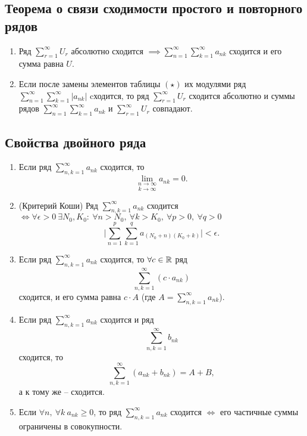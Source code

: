 \subsection{Теорема о связи сходимости простого и повторного рядов}

\begin{theorem}\leavevmode
    \begin{enumerate}
        \item Ряд $ \sum_{r=1}^{\infty}U_r $ абсолютно сходится $\implies \sum_{n=1}^{\infty}\sum_{k=1}^{\infty}a_{nk} $ сходится и его сумма равна $U$.

        \item Если после замены элементов таблицы $(\star)$ их модулями ряд \\ $ \sum_{n=1}^{\infty}\sum_{k=1}^{\infty}|a_{nk}| $ cходится, то ряд $ \sum_{r=1}^{\infty}U_r $ сходится абсолютно и суммы рядов $ \sum_{n=1}^{\infty}\sum_{k=1}^{\infty}a_{nk} $ и $ \sum_{r=1}^{\infty}U_r $ совпадают.
    \end{enumerate}
\end{theorem}

\subsection{Свойства двойного ряда}

\begin{theorem}\leavevmode
    \begin{enumerate}
        \item Если ряд $ \sum_{n,k = 1}^{\infty} a_{nk} $ сходится, то
              \[
                  \underset{k\rightarrow\infty}{\underset{n\rightarrow\infty}{\lim}}a_{nk} = 0.
              \]

        \item (Критерий Коши)
              Ряд $ \sum_{n,k = 1}^{\infty} a_{nk} $ сходится $\iff \forall \epsilon > 0 \ \exists N_0,K_0: \ \forall n > N_0, \ \forall k > K_0, \ \forall p > 0, \ \forall q > 0$
              \[
                  \bigg|\sum_{n=1}^{p}\sum_{k=1}^{q}a_{(N_0 + n)(K_0 + k)}\bigg| < \epsilon.
              \]

        \item Если ряд $ \sum_{n,k = 1}^{\infty} a_{nk} $ сходится, то $\forall c \in \mathbb{R}$ ряд
              \[
                  \sum_{n,k=1}^{\infty}(c\cdot a_{nk})
              \]
              сходится, и его сумма равна $c\cdot A$ (где $A = \sum_{n,k=1}^{\infty}a_{nk}$).

        \item Если ряд $ \sum_{n,k = 1}^{\infty} a_{nk} $ сходится и ряд
              \[
                  \sum_{n,k=1}^{\infty}b_{nk}
              \]
              сходится, то
              \[
                  \sum_{n,k=1}^{\infty}(a_{nk} + b_{nk}) = A + B,
              \]
              а к тому же -- сходится.

        \item Если $\forall n, \ \forall k \ a_{nk} \geqslant 0$, то ряд $ \sum_{n,k = 1}^{\infty} a_{nk} $ сходится $ \iff $ его частичные суммы ограничены в совокупности.
    \end{enumerate}
\end{theorem}

